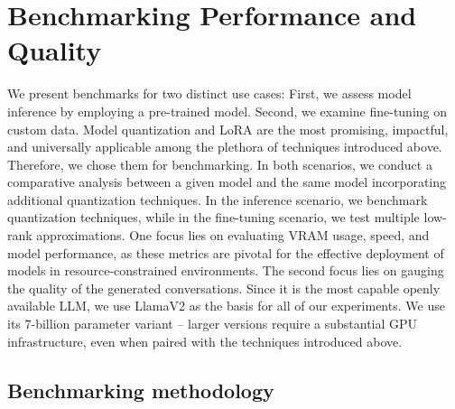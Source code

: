 \documentclass[conference]{IEEEtran}
\begin{document}
\section{Benchmarking Performance and Quality}
\label{sec:bench}
We present benchmarks for two distinct use cases: First, we assess model inference by employing a pre-trained model. Second, we examine fine-tuning on custom data. Model quantization and LoRA are the most promising, impactful, and universally applicable among the plethora of techniques introduced above. Therefore, we chose them for benchmarking. In both scenarios, we conduct a comparative analysis between a given model and the same model incorporating additional quantization techniques. In the inference scenario, we benchmark quantization techniques, while in the fine-tuning scenario, we test multiple low-rank approximations. One focus lies on evaluating VRAM usage, speed, and model performance, as these metrics are pivotal for the effective deployment of models in resource-constrained environments. The second focus lies on gauging the quality of the generated conversations. Since it is the most capable openly available LLM, we use LlamaV2 \cite{touvron_llama_2023} as the basis for all of our experiments. We use its 7-billion parameter variant -- larger versions require a substantial GPU infrastructure, even when paired with the techniques introduced above. 

\subsection{Benchmarking methodology}
\label{sec:bench_intro}

% 
\end{document}
